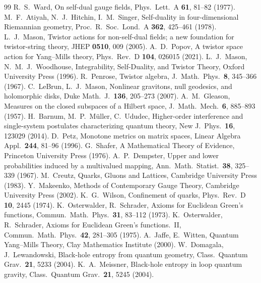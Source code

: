 \documentclass[11pt,a4paper]{article}
\theoremstyle{definition}
\theoremstyle{remark}
\begin{document}
\begin{thebibliography}{99}
 R.~S.~Ward, On self-dual gauge fields, Phys.\ Lett.\ A \textbf{61}, 81--82 (1977).
 M.~F.~Atiyah, N.~J.~Hitchin, I.~M.~Singer, Self-duality in four-dimensional Riemannian geometry, Proc.\ R.\ Soc.\ Lond.\ A \textbf{362}, 425--461 (1978).
 L.~J.~Mason, Twistor actions for non-self-dual fields; a new foundation for twistor-string theory, JHEP \textbf{0510}, 009 (2005).
 A.~D.~Popov, A twistor space action for Yang--Mills theory, Phys.\ Rev.\ D \textbf{104}, 026015 (2021).
 L.~J.~Mason, N.~M.~J.~Woodhouse, Integrability, Self-Duality, and Twistor Theory, Oxford University Press (1996).
 R.~Penrose, Twistor algebra, J.\ Math.\ Phys.\ \textbf{8}, 345--366 (1967).
 C.~LeBrun, L.~J.~Mason, Nonlinear gravitons, null geodesics, and holomorphic disks, Duke Math.\ J.\ \textbf{136}, 205--273 (2007).
 A.~M.~Gleason, Measures on the closed subspaces of a Hilbert space, J.\ Math.\ Mech.\ \textbf{6}, 885--893 (1957).
 H.~Barnum, M.~P.~M\"uller, C.~Ududec, Higher-order interference and single-system postulates characterizing quantum theory, New J.\ Phys.\ \textbf{16}, 123029 (2014).
 D.~Petz, Monotone metrics on matrix spaces, Linear Algebra Appl.\ \textbf{244}, 81--96 (1996).
 G.~Shafer, A Mathematical Theory of Evidence, Princeton University Press (1976).
 A.~P.~Dempster, Upper and lower probabilities induced by a multivalued mapping, Ann.\ Math.\ Statist.\ \textbf{38}, 325--339 (1967).
 M.~Creutz, Quarks, Gluons and Lattices, Cambridge University Press (1983).
 Y.~Makeenko, Methods of Contemporary Gauge Theory, Cambridge University Press (2002).
 K.~G.~Wilson, Confinement of quarks, Phys.\ Rev.\ D \textbf{10}, 2445 (1974).
 K.~Osterwalder, R.~Schrader, Axioms for Euclidean Green's functions, Commun.\ Math.\ Phys.\ \textbf{31}, 83--112 (1973).
 K.~Osterwalder, R.~Schrader, Axioms for Euclidean Green's functions.\ II, Commun.\ Math.\ Phys.\ \textbf{42}, 281--305 (1975).
 A.~Jaffe, E.~Witten, Quantum Yang--Mills Theory, Clay Mathematics Institute (2000).
 W.~Domagala, J.~Lewandowski, Black-hole entropy from quantum geometry, Class.\ Quantum Grav.\ \textbf{21}, 5233 (2004).
 K.~A.~Meissner, Black-hole entropy in loop quantum gravity, Class.\ Quantum Grav.\ \textbf{21}, 5245 (2004).

\end{thebibliography}
\end{document}
